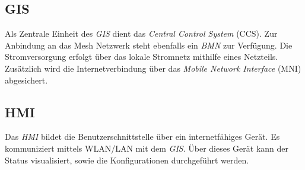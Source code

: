 \subsection{GIS}\label{sec:Konzeptschema_GIS}

Als Zentrale Einheit des \textit{GIS} dient das \textit{Central Control System} (CCS). Zur Anbindung an das Mesh Netzwerk steht ebenfalls ein \textit{BMN} zur Verfügung. Die Stromversorgung erfolgt über das lokale Stromnetz mithilfe eines Netzteils. Zusätzlich wird die Internetverbindung über das \textit{Mobile Network Interface} (MNI) abgesichert. 

\subsection{HMI}\label{sec:Konzeptschema_HMI}

Das \textit{HMI} bildet die Benutzerschnittstelle über ein internetfähiges Gerät. Es kommuniziert mittels WLAN/LAN mit dem \textit{GIS}. Über dieses Gerät kann der Status visualisiert, sowie die Konfigurationen durchgeführt werden.












